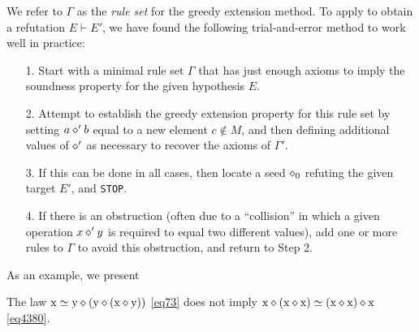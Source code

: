 We refer to $\Gamma$ as the \emph{rule set} for the greedy extension method. To apply  to obtain a refutation $E \vdash E'$, we have found the following trial-and-error method to work well in practice:
\begin{itemize}
\item[1.] Start with a minimal rule set $\Gamma$ that has just enough axioms to imply the soundness property for the given hypothesis $E$.
\item[2.] Attempt to establish the greedy extension property for this rule set by setting $a \diamond' b$ equal to a new element $c \not \in M$, and then defining additional values of $\diamond'$ as necessary to recover the axioms of $\Gamma'$.
\item[3.]  If this can be done in all cases, then locate a seed $\diamond_0$ refuting the given target $E'$, and \texttt{STOP}.
\item[4.]  If there is an obstruction (often due to a ``collision'' in which a given operation $x \diamond' y$ is required to equal two different values), add one or more rules to $\Gamma$ to avoid this obstruction, and return to Step 2.
\end{itemize}

As an example, we present

\begin{proposition}\label{73-4380} The law $\mathrm{x} \simeq \mathrm{y} \diamond (\mathrm{y} \diamond (\mathrm{x} \diamond \mathrm{y}))$ \eqref{eq73} does not imply $\mathrm{x} \diamond (\mathrm{x} \diamond \mathrm{x}) \simeq (\mathrm{x} \diamond \mathrm{x}) \diamond \mathrm{x}$ \eqref{eq4380}.
\end{proposition}

